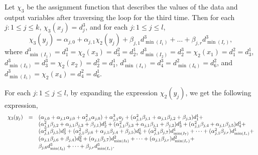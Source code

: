 \documentclass[runningheads,a4paper]{llncs}
\begin{document}
Let $\chi_3$ be the assignment function that describes the values of the data and output variables after traversing the loop for the third time. Then for each $j: 1 \le j \le k$, $\chi_3(x_j)=d^3_j$, and for each $j: 1 \le j \le l$, 
\[\chi_3(y_j) = \alpha_{j,0} + \alpha_{j,1} \chi_2(y_j) + \beta_{j,1} d^3_{\min(I_1)} + \dots + \beta_{j,r} d^3_{\min(I_r)},\]
where $d^3_{\min(I_1)}=d^3_1 = \chi_2(x_3)=d^2_3=d^1_2$, $d^3_{\min(I_2)}=d^3_2 = \chi_2(x_1)=d^2_1=d^1_3$, $d^3_{\min(I_3)}=d^3_3 = \chi_2(x_2)=d^2_2=d^1_1$, $d^3_{\min(I_4)}=d^3_4 = d^2_{\min(I_6)}=d^2_6$, and $d^3_{\min(I_5)}=\chi_2(x_4)=d^2_4=d^1_6$.

For each $j: 1 \le j \le l$, 
by expanding the expression $\chi_2(y_j)$, we  get the following expression, 
\[
\begin{array}{l c l}
\chi_3(y_j) & = & 
%
%
(\alpha_{j,0} + \alpha_{j,1} \alpha_{j,0}+ \alpha^2_{j,1} \alpha_{j,0}) + \alpha^3_{j,1} o_j + (\alpha^2_{j,1} \beta_{j,1}+ \alpha_{j,1}\beta_{j,2} + \beta_{j,3} ) d^1_1 + \\
& & (\alpha^2_{j,1} \beta_{j,2}+\alpha_{j,1}\beta_{j,3} + \beta_{j,1} ) d^1_2 + (\alpha^2_{j,1} \beta_{j,3} + \alpha_{j,1}\beta_{j,1} + \beta_{j,2}  ) d^1_3 + (\alpha^2_{j,1} \beta_{j,4}+\alpha_{j,1}\beta_{j,5}) d^1_4 +\\
& & (\alpha^2_{j,1} \beta_{j,5}) d^1_5 + (\alpha^2_{j,1} \beta_{j,6}+\alpha_{j,1}\beta_{j,4}+\beta_{j,5})d^1_6 + (\alpha^2_{j,1} \beta_{j,7}) d^1_{\min(I_7)}+ \dots + (\alpha^2_{j,1} \beta_{j,r}) d^1_{\min(I_r)} + \\
& & (\alpha_{j,1}\beta_{j,6}+\beta_{j,4}) d^2_{6} + (\alpha_{j,1}\beta_{j,7}) d^2_{\min(I_7)} + \dots + (\alpha_{j,1}\beta_{j,r}) d^2_{\min(I_r)}+  \\
& &  \beta_{j,6} d^3_{\min(I_6)} + \dots + \beta_{j,r} d^3_{\min(I_r)}.
\end{array}
\] 
\end{document}

